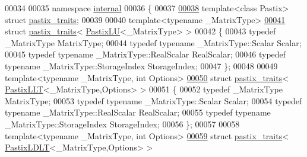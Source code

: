 \begin{DoxyCode}
00034 
00035 \textcolor{keyword}{namespace }\hyperlink{namespaceinternal}{internal}
00036 \{
00037     
\hyperlink{struct_eigen_1_1internal_1_1pastix__traits}{00038}   \textcolor{keyword}{template}<\textcolor{keyword}{class} Pastix> \textcolor{keyword}{struct }\hyperlink{struct_eigen_1_1internal_1_1pastix__traits}{pastix\_traits};
00039 
00040   \textcolor{keyword}{template}<\textcolor{keyword}{typename} \_MatrixType>
\hyperlink{struct_eigen_1_1internal_1_1pastix__traits_3_01_pastix_l_u_3_01___matrix_type_01_4_01_4}{00041}   \textcolor{keyword}{struct }\hyperlink{struct_eigen_1_1internal_1_1pastix__traits}{pastix\_traits}< \hyperlink{class_eigen_1_1_pastix_l_u}{PastixLU}<\_MatrixType> >
00042   \{
00043     \textcolor{keyword}{typedef} \_MatrixType MatrixType;
00044     \textcolor{keyword}{typedef} \textcolor{keyword}{typename} \_MatrixType::Scalar Scalar;
00045     \textcolor{keyword}{typedef} \textcolor{keyword}{typename} \_MatrixType::RealScalar RealScalar;
00046     \textcolor{keyword}{typedef} \textcolor{keyword}{typename} \_MatrixType::StorageIndex StorageIndex;
00047   \};
00048 
00049   \textcolor{keyword}{template}<\textcolor{keyword}{typename} \_MatrixType, \textcolor{keywordtype}{int} Options>
\hyperlink{struct_eigen_1_1internal_1_1pastix__traits_3_01_pastix_l_l_t_3_01___matrix_type_00_01_options_01_4_01_4}{00050}   \textcolor{keyword}{struct }\hyperlink{struct_eigen_1_1internal_1_1pastix__traits}{pastix\_traits}< \hyperlink{class_eigen_1_1_pastix_l_l_t}{PastixLLT}<\_MatrixType,Options> >
00051   \{
00052     \textcolor{keyword}{typedef} \_MatrixType MatrixType;
00053     \textcolor{keyword}{typedef} \textcolor{keyword}{typename} \_MatrixType::Scalar Scalar;
00054     \textcolor{keyword}{typedef} \textcolor{keyword}{typename} \_MatrixType::RealScalar RealScalar;
00055     \textcolor{keyword}{typedef} \textcolor{keyword}{typename} \_MatrixType::StorageIndex StorageIndex;
00056   \};
00057 
00058   \textcolor{keyword}{template}<\textcolor{keyword}{typename} \_MatrixType, \textcolor{keywordtype}{int} Options>
\hyperlink{struct_eigen_1_1internal_1_1pastix__traits_3_01_pastix_l_d_l_t_3_01___matrix_type_00_01_options_01_4_01_4}{00059}   \textcolor{keyword}{struct }\hyperlink{struct_eigen_1_1internal_1_1pastix__traits}{pastix\_traits}< \hyperlink{class_eigen_1_1_pastix_l_d_l_t}{PastixLDLT}<\_MatrixType,Options> >

\end{DoxyCode}
